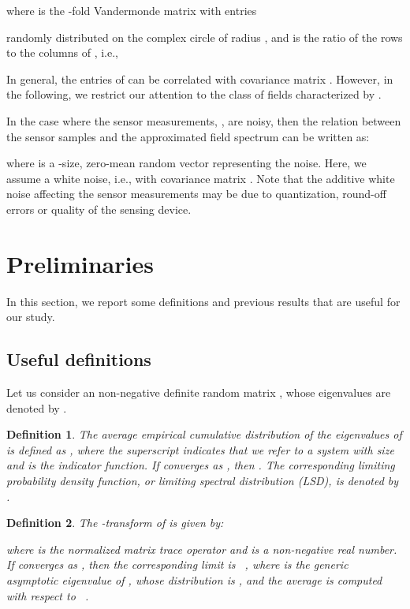 \documentclass[11pt, draftcls, onecolumn, a4paper]{IEEEtran}
\newtheorem{definition}{Definition}[section]
\begin{document}
where  is the  -fold Vandermonde matrix with
entries
  
randomly distributed on the complex circle of radius , and
 is the ratio of the rows to the columns of , i.e., 
 


In general, the entries of  can be correlated with covariance
matrix . However, in the following, we
restrict our attention to the class of fields characterized by
.

In the case where the sensor measurements, , are
noisy, then the relation between the sensor samples and the 
approximated field spectrum can be written as:

where  is a -size, zero-mean random vector  representing the noise.
Here, we assume a white noise, i.e., with covariance matrix 
.  
Note that the additive white noise affecting the
sensor measurements may be due to quantization, round-off errors or
quality of the sensing device.


\section{Preliminaries\label{sec:preliminaries}} 

In this section, we report some definitions and previous results that 
are useful for our study.

\subsection{Useful definitions} 
Let us consider an  non-negative definite random matrix ,
whose eigenvalues are denoted by .

\begin{definition}
The average empirical cumulative distribution of the eigenvalues of
 is defined as , where
the superscript  indicates that we refer to a system with size
 and  is the indicator function.  If
 converges as ,
then .  The corresponding limiting probability
density function, or limiting spectral distribution (LSD), is denoted
by .
\end{definition}

\begin{definition}
The -transform of  is given by:

where  is the normalized matrix trace operator 
and  is a non-negative real number.  If
 converges as , then
the corresponding limit is ~\cite[p. 40]{tutorial},  where 
 is the generic asymptotic eigenvalue of , 
whose distribution is , and the average is
computed with respect to ~\cite{tutorial}.
\end{definition}
\end{document}
